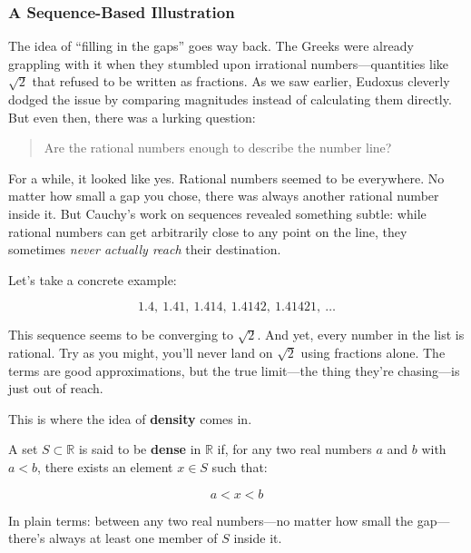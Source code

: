 \subsubsection{A Sequence-Based Illustration}


The idea of “filling in the gaps” goes way back. The Greeks were already grappling with it when they stumbled upon irrational numbers—quantities like \( \sqrt{2} \) that refused to be written as fractions. As we saw earlier, Eudoxus cleverly dodged the issue by comparing magnitudes instead of calculating them directly. But even then, there was a lurking question:

\begin{quote}
Are the rational numbers enough to describe the number line?
\end{quote}

For a while, it looked like yes. Rational numbers seemed to be everywhere. No matter how small a gap you chose, there was always another rational number inside it. But Cauchy’s work on sequences revealed something subtle: while rational numbers can get arbitrarily close to any point on the line, they sometimes \textit{never actually reach} their destination.

Let’s take a concrete example:

\[
1.4,\ 1.41,\ 1.414,\ 1.4142,\ 1.41421,\ \dots
\]

This sequence seems to be converging to \( \sqrt{2} \). And yet, every number in the list is rational. Try as you might, you’ll never land on \( \sqrt{2} \) using fractions alone. The terms are good approximations, but the true limit—the thing they’re chasing—is just out of reach.

This is where the idea of \textbf{density} comes in.

A set \( S \subset \mathbb{R} \) is said to be \textbf{dense} in \( \mathbb{R} \) if, for any two real numbers \( a \) and \( b \) with \( a < b \), there exists an element \( x \in S \) such that:

\[
a < x < b
\]

In plain terms: between any two real numbers—no matter how small the gap—there’s always at least one member of \( S \) inside it.


